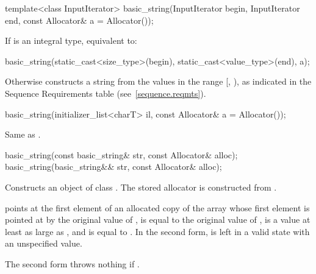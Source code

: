%
\begin{itemdecl}
template<class InputIterator>
  basic_string(InputIterator begin, InputIterator end, const Allocator& a = Allocator());
\end{itemdecl}

\begin{itemdescr}
\pnum
\effects
If  is an integral type,
equivalent to:
\begin{codeblock}
basic_string(static_cast<size_type>(begin), static_cast<value_type>(end), a);
\end{codeblock}
Otherwise constructs a string from the values in the range [, ),
as indicated in the Sequence Requirements table
(see~\ref{sequence.reqmts}).
%
\end{itemdescr}

%
\begin{itemdecl}
basic_string(initializer_list<charT> il, const Allocator& a = Allocator());
\end{itemdecl}

\begin{itemdescr}
\pnum
\effects Same as .
\end{itemdescr}

%
\begin{itemdecl}
basic_string(const basic_string& str, const Allocator& alloc);
basic_string(basic_string&& str, const Allocator& alloc);
\end{itemdecl}

\begin{itemdescr}
\pnum
\effects Constructs an object of class .
The stored allocator is constructed from .

\pnum
\ensures
{} points at the first element of an allocated copy
of the array whose first element is pointed at by the original
value of ,  is equal to the
original value of ,  is a value
at least as large as , and  is
equal to .
In the second form,  is left in a valid state with an
unspecified value.

\pnum
\throws The second form throws nothing if .
\end{itemdescr}

